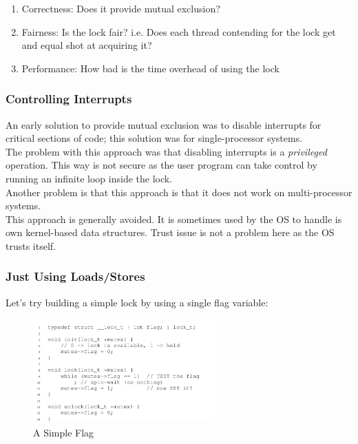 \begin{enumerate}
    \item Correctness: Does it provide mutual exclusion?
    \item Fairness: Is the lock fair? i.e. Does each thread contending for the lock get
        and equal shot at acquiring it?
    \item Performance: How bad is the time overhead of using the lock
\end{enumerate}

\subsubsection{Controlling Interrupts}

An early solution to provide mutual exclusion was to disable interrupts for
critical sections of code; this solution was for single-processor systems.\\

The problem with this approach was that disabling interrupts is a \textit{privileged}
operation. This way is not secure as the user program can take control by
running an infinite loop inside the lock.\\

Another problem is that this approach is that it does not work on multi-processor
systems.\\

This approach is generally avoided. It is sometimes used by the OS to handle
is own kernel-based data structures. Trust issue is not a problem here as
the OS trusts itself.

\subsubsection{Just Using Loads/Stores}

Let's try building a simple lock by using a single flag variable:

\begin{figure}[h!]
    \begin{center}
        \includegraphics[width=7cm, height=4cm]{img/281.png}
        \caption{A Simple Flag}
    \end{center}
\end{figure}

